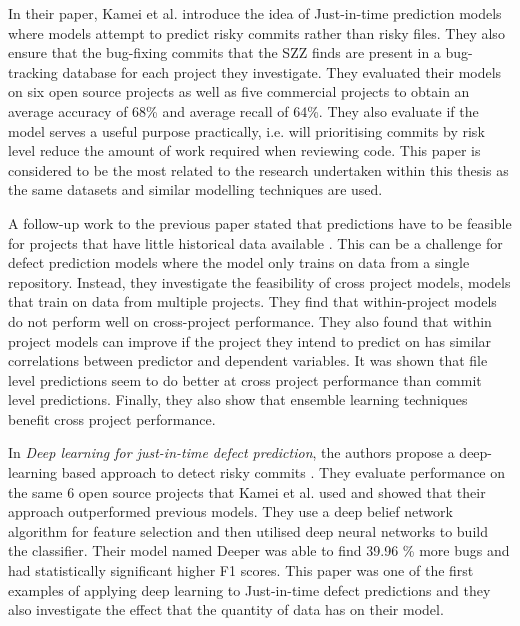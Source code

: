 \documentclass[../main.tex]{subfiles}
\begin{document}
In their paper, Kamei et al. \cite{kamei2013large} introduce the idea of Just-in-time prediction models where models attempt to predict risky commits rather than risky files. They also ensure that the bug-fixing commits that the SZZ finds are present in a bug-tracking database for each project they investigate. They evaluated their models on six open source projects as well as five commercial projects to obtain an average accuracy of 68\% and average recall of 64\%. They also evaluate if the model serves a useful purpose practically, i.e. will prioritising commits by risk level reduce the amount of work required when reviewing code. This paper is considered to be the most related to the research undertaken within this thesis as the same datasets and similar modelling techniques are used. 

A follow-up work to the previous paper stated that predictions have to be feasible for projects that have little historical data available \cite{fukushima2014empirical}. This can be a challenge for defect prediction models where the model only trains on data from a single repository. Instead, they investigate the feasibility of cross project models, models that train on data from multiple projects. They find that within-project models do not perform well on cross-project performance. They also found that within project models can improve if the project they intend to predict on has similar correlations between predictor and dependent variables. It was shown that file level predictions seem to do better at cross project performance than commit level predictions. Finally, they also show that ensemble learning techniques benefit cross project performance. 

In \textit{Deep learning for just-in-time defect prediction}, the authors propose a deep-learning based approach to detect risky commits \cite{yang2015deep}. They evaluate performance on the same 6 open source projects that Kamei et al. used and showed that their approach outperformed previous models. They use a deep belief network algorithm for feature selection and then utilised deep neural networks to build the classifier. Their model named Deeper was able to find 39.96 \% more bugs and had statistically significant higher F1 scores. This paper was one of the first examples of applying deep learning to Just-in-time defect predictions and they also investigate the effect that the quantity of data has on their model.
\end{document}
